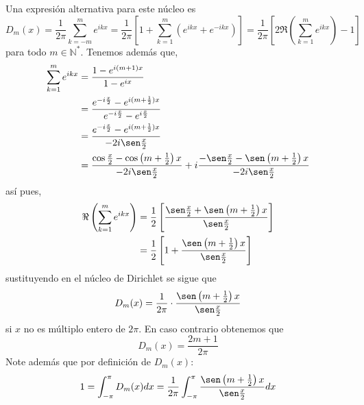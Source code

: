 \documentclass[12pt]{report}
\theoremstyle{largebreak}
\begin{document}
    Una expresión alternativa para este núcleo es
    \begin{equation*}
        D_m(x)=\frac{1}{2\pi}\sum_{ k=-m}^me^{ ikx}=\frac{1}{2\pi}\left[1+\sum_{ k=1}^m\left(e^{ ikx}+e^{ -ikx} \right) \right]=\frac{1}{2\pi}\left[2\Re\left(\sum_{ k=1}^m e^{ ikx} \right)-1 \right]
    \end{equation*}
    para todo $m\in\mathbb{N}^*$. Tenemos además que,
    \begin{equation*}
        \begin{split}
            \sum_{ k=1}^m e^{ ikx}&=\frac{1-e^{ i(m+1)x}}{1-e^{ix}}\\
            &=\frac{e^{ -i\frac{x}{2}}-e^{ i(m+\frac{1}{2})x}}{e^{ -i\frac{x}{2}}-e^{i\frac{x}{2}}}\\
            &=\frac{e^{ -i\frac{x}{2}}-e^{ i(m+\frac{1}{2})x}}{-2i\sen\frac{x}{2}}\\
            &=\frac{\cos\frac{x}{2}-\cos\left(m+\frac{1}{2}\right)x}{-2i\sen\frac{x}{2}}+i\frac{-\sen\frac{x}{2}-\sen\left(m+\frac{1}{2}\right)x}{-2i\sen\frac{x}{2}}\\
        \end{split}
    \end{equation*}
    así pues,
    \begin{equation*}
        \begin{split}
            \Re\left(\sum_{ k=1}^m e^{ ikx} \right)&=\frac{1}{2}\left[\frac{\sen\frac{x}{2}+\sen\left(m+\frac{1}{2} \right)x}{\sen\frac{x}{2}} \right]\\
            &=\frac{1}{2}\left[1+\frac{\sen\left(m+\frac{1}{2} \right)x}{\sen\frac{x}{2}} \right]\\
        \end{split}
    \end{equation*}
    sustituyendo en el núcleo de Dirichlet se sigue que
    \begin{equation*}
        D_m(x)=\frac{1}{2\pi}\cdot\frac{\sen\left(m+\frac{1}{2} \right)x}{\sen\frac{x}{2}}
    \end{equation*}
    si $x$ no es múltiplo entero de $2\pi$. En caso contrario obtenemos que
    \begin{equation*}
        D_m(x)=\frac{2m+1}{2\pi}
    \end{equation*}
    Note además que por definición de $D_m(x)$:
    \begin{equation*}
        1=\int_{-\pi}^\pi D_m(x)dx=\frac{1}{2\pi}\int_{-\pi}^{\pi}\frac{\sen\left(m+\frac{1}{2} \right)x}{\sen\frac{x}{2}}dx
    \end{equation*}
\end{document}
